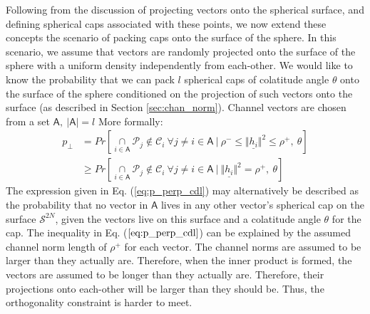 Following from the discussion of projecting vectors onto the spherical surface, and defining spherical caps associated with these points, we now extend these concepts the scenario of packing caps onto the surface of the sphere. In this scenario, we assume that vectors are randomly projected onto the surface of the sphere with a uniform density independently from each-other. We would like to know the probability that we can pack $l$ spherical caps of colatitude angle $\theta$ onto the surface of the sphere conditioned on the projection of such vectors onto the surface (as described in Section \ref{sec:chan_norm}). Channel vectors are chosen from a set $\mathsf{A},\ \vert \mathsf{A}\vert = l$ More formally:
\begin{equation}\label{eq:p_perp_cdl}
    \begin{aligned}
        p_\perp &= Pr[\underset{i \in\mathsf{A}}{\cap} \mathcal{P}_j\not\in\mathcal{C}_i\ \forall j\neq i\in\mathsf{A}\ \vert\ \rho^-\leq  \Vert \underline{h_i} \Vert^2 \leq \rho^+,\ \theta ]\\
        &\geq Pr[\underset{i \in\mathsf{A}}{\cap} \mathcal{P}_j\not\in\mathcal{C}_i\ \forall j\neq i\in\mathsf{A}\ \vert\ \Vert \underline{h_i} \Vert^2 = \rho^+,\ \theta ]
    \end{aligned}
\end{equation}
The expression given in Eq. (\ref{eq:p_perp_cdl}) may alternatively be described as the probability that no vector in $\mathsf{A}$ lives in any other vector's spherical cap on the surface $\mathcal{S}^{2N}$, given the vectors live on this surface and a colatitude angle $\theta$ for the cap. The inequality in Eq. ($\ref{eq:p_perp_cdl}$) can be explained by the assumed channel norm length of $\rho^+$ for each vector. The channel norms are assumed to be larger than they actually are. Therefore, when the inner product is formed, the vectors are assumed to be longer than they actually are. Therefore, their projections onto each-other will be larger than they should be. Thus, the orthogonality constraint is harder to meet.

